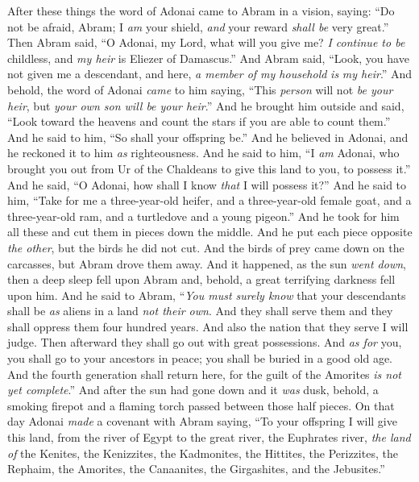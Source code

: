 \begin{biblechapter} %
 After these things the word of Adonai came to Abram in a vision, saying: “Do not be afraid, Abram; I \textit{am} your shield, \textit{and} your reward \textit{shall be} very great.”
\verse Then Abram said, “O Adonai, my Lord, what will you give me? \textit{I continue to be} childless, and \textit{my heir} is Eliezer of Damascus.”
\verse And Abram said, “Look, you have not given me a descendant, and here, \textit{a member of my household} \textit{is} \textit{my heir}.”
\verse And behold, the word of Adonai \textit{came} to him saying, “This \textit{person} will not \textit{be your heir}, but \textit{your own son will be your heir}.”
\verse And he brought him outside and said, “Look toward the heavens and count the stars if you are able to count them.” And he said to him, “So shall your offspring be.”
\verse And he believed in Adonai, and he reckoned it to him \textit{as} righteousness.
\verse And he said to him, “I \textit{am} Adonai, who brought you out from Ur of the Chaldeans to give this land to you, to possess it.”
\verse And he said, “O Adonai, how shall I know \textit{that} I will possess it?”
\verse And he said to him, “Take for me a three-year-old heifer, and a three-year-old female goat, and a three-year-old ram, and a turtledove and a young pigeon.”
\verse And he took for him all these and cut them in pieces down the middle. And he put each piece opposite \textit{the other}, but the birds he did not cut.
\verse And the birds of prey came down on the carcasses, but Abram drove them away.
\verse And it happened, as the sun \textit{went down}, then a deep sleep fell upon Abram and, behold, a great terrifying darkness fell upon him.
\verse And he said to Abram, “\textit{You must surely know} that your descendants shall be \textit{as} aliens in a land \textit{not their own}. And they shall serve them and they shall oppress them four hundred years.
\verse And also the nation that they serve I will judge. Then afterward they shall go out with great possessions.
\verse And \textit{as for} you, you shall go to your ancestors in peace; you shall be buried in a good old age.
\verse And the fourth generation shall return here, for the guilt of the Amorites \textit{is not yet complete}.”
\verse And after the sun had gone down and it \textit{was} dusk, behold, a smoking firepot and a flaming torch passed between those half pieces.
\verse On that day Adonai \textit{made} a covenant with Abram saying, “To your offspring I will give this land, from the river of Egypt to the great river, the Euphrates river,
\verse \textit{the land of} the Kenites, the Kenizzites, the Kadmonites,
\verse the Hittites, the Perizzites, the Rephaim,
\verse the Amorites, the Canaanites, the Girgashites, and the Jebusites.”
\end{biblechapter}

